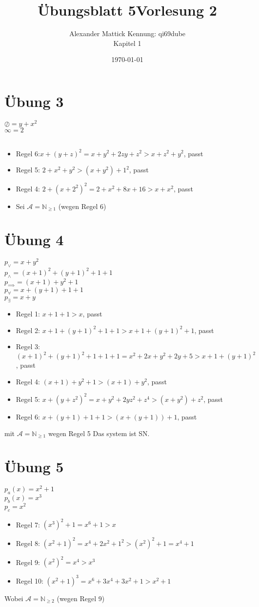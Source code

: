 \documentclass{article}
\title{Übungsblatt 5}
\author{
Alexander Mattick Kennung: qi69dube\\
Kapitel 1
}
\date{\today}
\title{Vorlesung 2}
\begin{document}
	\maketitle\noindent
	\section{Übung 3}
	$\oslash = y+x^2$\\
	$\infty=2$\\
	\\
	\begin{itemize}
	\item Regel 6:$ x+(y+z)^2 = x+y^2+2zy+z^2 >x+z^2+y^2$, passt
	\item Regel 5: $2+x^2+y^2 > (x+y^2)+1^2$, passt
	\item Regel 4: $2+(x+2^2)^2 = 2+x^2+8x+16 > x+x^2$, passt
	\item Sei $\mathcal{A} = \mathbb{N}_{\geq1}$ (wegen Regel 6)
	\end{itemize}

	\section{Übung 4}
	$p_{\lor} = x+y^2$\\
	$p_{\land} = (x+1)^2+(y+1)^2+1+1$\\
	$p_{\implies} = (x+1)+y^2+1$\\
	$p_{\forall} = x+(y+1)+1+1$\\
	$p_{\exists} = x+y$\\
	\begin{itemize}
		\item Regel 1: $x+1+1> x$, passt
		\item Regel 2: $x+1+(y+1)^2+1+1 > x+1+(y+1)^2+1$, passt
		\item Regel 3: $(x+1)^2+(y+1)^2+1+1+1=x^2+2x+y^2+2y+5 > x+1+(y+1)^2$, passt
		\item Regel 4: $(x+1)+y^2+1> (x+1)+y^2$, passt
		\item Regel 5: $x+(y+z^2)^2 = x+y^2+2yz^2+z^4> (x+y^2)+z^2$, passt
		\item Regel 6: $x+(y+1)+1+1 > (x+(y+1))+1$, passt	
	\end{itemize}
	mit $\mathcal{A} = \mathbb{N}_{\geq 1}$ wegen Regel 5
	Das system ist SN.\\
	\section{Übung 5} 
	$p_a(x) = x^2+1$\\
	$p_b(x) = x^3$\\
	$p_c = x^2$\\
	\begin{itemize}
		\item Regel 7: $(x^3)^2+1 = x^6+1>x$
		\item Regel 8: $(x^2+1)^2 = x^4+2x^2+1^2 > (x^2)^2+1 = x^4+1$
		\item Regel 9: $(x^2)^2=x^4>x^3$
		\item Regel 10: $(x^2+1)^3= x^6+3x^4+3x^2+1>x^2+1$
	\end{itemize}
	Wobei $\mathcal{A} = \mathbb{N}_{\geq 2}$ (wegen Regel 9)
\end{document}
